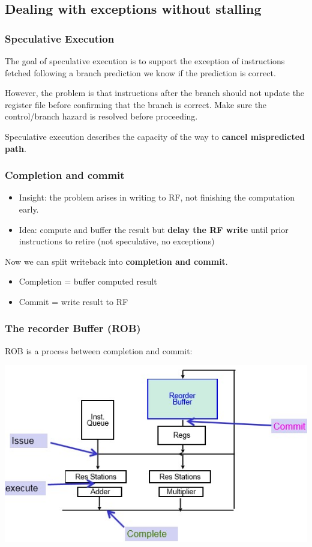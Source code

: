 \documentclass[letterpaper,12pt]{article}
\begin{document}
\subsection{Dealing with exceptions without stalling}

\subsubsection{Speculative Execution}

The goal of speculative execution is to support the exception of instructions fetched following a branch prediction  we know if the prediction is correct.

However, the problem is that instructions after the branch should not update the register file before confirming that the branch is correct. Make sure the control/branch hazard is resolved before proceeding.

Speculative execution describes the capacity of the way to \textbf{cancel mispredicted path}.

\subsubsection{Completion and commit}
\begin{itemize}
    \item Insight: the problem arises in writing to RF, not finishing the computation early.
    \item Idea: compute and buffer the result but \textbf{delay the RF write} until prior instructions  to retire (not speculative, no exceptions)
\end{itemize}

Now we can split writeback into \textbf{completion and commit}.
\begin{itemize}
    \item Completion = buffer computed result
    \item Commit = write result to RF
\end{itemize}

\subsubsection{The recorder Buffer (ROB)}

ROB is a process between completion and commit:

\includegraphics*[scale = 0.7]{Image/ROB figure.jpg}
\end{document}
